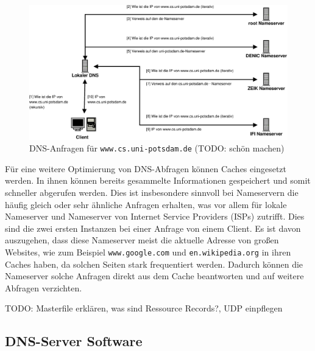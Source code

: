 \documentclass[a4paper, 12pt, BCOR10mm, DIV12, toc=bibliography, toc=listof, german]{scrbook}
\begin{document}
				\begin{figure}
					\centering
					\includegraphics[width=\textwidth]{images/request}
					\caption{DNS-Anfragen für \texttt{www.cs.uni-potsdam.de} (TODO: schön machen)}
					\label{fig:bsp-request}
				\end{figure}

				Für eine weitere Optimierung von DNS-Abfragen können Caches eingesetzt werden. In ihnen
				können bereits gesammelte Informationen gespeichert und somit schneller abgerufen werden.
				Dies ist insbesondere sinnvoll bei Nameservern die häufig gleich oder sehr ähnliche Anfragen
				erhalten, was vor allem für lokale Nameserver und Nameserver von Internet Service Providers
				(ISPs) zutrifft. Dies sind die zwei ersten Instanzen bei einer Anfrage von einem Client. Es
				ist davon auszugehen, dass diese Nameserver meist die aktuelle Adresse von großen Websites,
				wie zum Beispiel \texttt{www.google.com} und \texttt{en.wikipedia.org} in ihren Caches
				haben, da solchen Seiten stark frequentiert werden. Dadurch können die Nameserver solche
				Anfragen direkt aus dem Cache beantworten und auf weitere Abfragen verzichten.

				TODO: Masterfile erklären, was sind Ressource Records?, UDP einpflegen
				
				

			\subsection{DNS-Server Software} %
			\label{sub:software}
			
\end{document}
